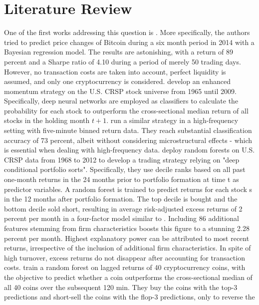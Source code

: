 \section{Literature Review}
One of the first works addressing this question is \cite{shah2014bayesianRegression}. 
More specifically, the authors tried to predict price changes of Bitcoin during a six month period in 2014 with a Bayesian
regression model. The results are astonishing, with a return of 89 percent and a Sharpe ratio of
4.10 during a period of merely 50 trading days. However, no transaction costs are taken into account,
perfect liquidity is assumed, and only one cryptocurrency is considered.
\cite{takeuchi2013momentumTrading} develop an enhanced momentum strategy on the U.S. CRSP
stock universe from 1965 until 2009. Specifically, deep neural networks are employed as
classifiers to calculate the probability for each stock to outperform the cross-sectional median
return of all stocks in the holding month $t + 1$.
\cite{dixon2015annMarketPrediction} run a similar strategy in a high-frequency setting
with five-minute binned return data. They reach substantial classification accuracy of 73
percent, albeit without considering microstructural effects - which is essential when dealing with
high-frequency data.
\cite{moritz2014partFutureReturns} deploy random forests on U.S. CRSP data from 1968 to
2012 to develop a trading strategy relying on "deep conditional portfolio sorts". Specifically,
they use decile ranks based on all past one-month returns in the 24 months prior to portfolio
formation at time t as predictor variables. A random forest is trained to predict returns for
each stock s in the 12 months after portfolio formation. The top decile is bought and the
bottom decile sold short, resulting in average risk-adjusted excess returns of 2 percent per
month in a four-factor model similar to \cite{carhart1997mutualFundPerformance}. 
Including 86 additional features stemming from firm characteristics boosts this figure to a stunning 2.28 percent per month.
Highest explanatory power can be attributed to most recent returns, irrespective of the
inclusion of additional firm characteristics. In spite of high turnover, excess returns do not
disappear after accounting for transaction costs.
\cite{krauss2019statisticalArbitrage} train a random
forest on lagged returns of 40 cryptocurrency coins, with the objective to predict whether a coin
outperforms the cross-sectional median of all 40 coins over the subsequent 120 min. They buy the coins
with the top-3 predictions and short-sell the coins with the flop-3 predictions, only to reverse the

